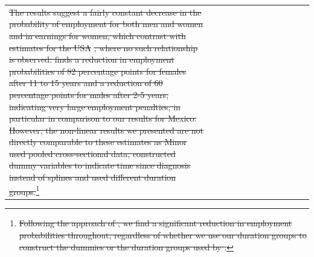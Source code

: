 \documentclass[12pt,english]{article}
\providecommand{\DIFdeltex}[1]{{\protect\color{red}\sout{#1}}}                      %
\providecommand{\DIFdelFL}[1]{\DIFdel{#1}} %
\providecommand{\DIFdel}[1]{\texorpdfstring{\DIFdeltex{#1}}{}} %
\begin{document}
\begin{table}[!ht]
\begin{center}
\begin{adjustbox}{max width=0.8\linewidth}
\begin{threeparttable}
{\begin{tabular}{l*{6}{S
S}}
\DIFdelFL{The results suggest a fairly constant decrease in the probability of employment for both men and women and in earnings for women, which contrast with estimates for the USA }%
\DIFdelFL{, where no such relationship is observed.  \textcite{Minor2013} finds a reduction in employment probabilities of 82 percentage points for females after 11 to 15 years and a reduction of 60 percentage points for males after 2-5 years, indicating very large employment penalties, in particular in comparison to our results for Mexico. However, the non-linear results we presented are not directly comparable to these estimates as Minor used pooled cross-sectional data, constructed dummy variables to indicate time since diagnosis instead of splines and used different duration groups.}\footnote{\DIFdelFL{Following the approach of \textcite{Minor2013}, we find a significant reduction in employment probabilities throughout, regardless of whether we use our duration groups to construct the dummies or the duration groups used by \textcite{Minor2013}.}} 
\addtocounter{footnote}{-1}%


\end{tabular}}
\end{threeparttable}
\end{adjustbox}
\end{center}
\end{table}
\end{document}
